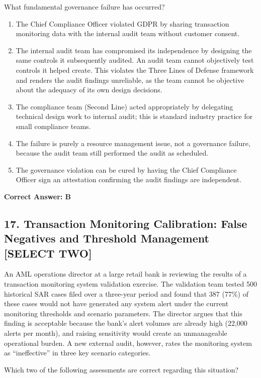 \documentclass[11pt,a4paper]{article}
\begin{document}
	What fundamental governance failure has occurred?
	
	\begin{enumerate}[label=\Alph*.]
		\item The Chief Compliance Officer violated GDPR by sharing transaction monitoring data with the internal audit team without customer consent.
		\item The internal audit team has compromised its independence by designing the same controls it subsequently audited. An audit team cannot objectively test controls it helped create. This violates the Three Lines of Defense framework and renders the audit findings unreliable, as the team cannot be objective about the adequacy of its own design decisions.
		\item The compliance team (Second Line) acted appropriately by delegating technical design work to internal audit; this is standard industry practice for small compliance teams.
		\item The failure is purely a resource management issue, not a governance failure, because the audit team still performed the audit as scheduled.
		\item The governance violation can be cured by having the Chief Compliance Officer sign an attestation confirming the audit findings are independent.
	\end{enumerate}
	\textbf{Correct Answer: B}
	
	\subsection{17. Transaction Monitoring Calibration: False Negatives and Threshold Management \textnormal{[SELECT TWO]}}
	
	An AML operations director at a large retail bank is reviewing the results of a transaction monitoring system validation exercise. The validation team tested 500 historical SAR cases filed over a three-year period and found that 387 (77\%) of these cases would not have generated any system alert under the current monitoring thresholds and scenario parameters. The director argues that this finding is acceptable because the bank's alert volumes are already high (22,000 alerts per month), and raising sensitivity would create an unmanageable operational burden. A new external audit, however, rates the monitoring system as ``ineffective'' in three key scenario categories.
	
	Which two of the following assessments are correct regarding this situation?
	
\end{document}
